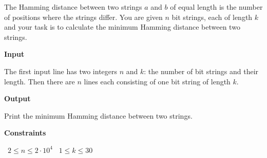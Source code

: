 The Hamming distance between two strings $a$ and $b$ of equal length is the number of positions where the strings differ.
You are given $n$ bit strings, each of length $k$ and your task is to calculate the minimum Hamming distance between two strings.

\vspace{0.3cm}\noindent\textbf{Input}

The first input line has two integers $n$ and $k$: the number of bit strings and their length.
Then there are $n$ lines each consisting of one bit string of length $k$.

\vspace{0.3cm}\noindent\textbf{Output}

Print the minimum Hamming distance between two strings.

\vspace{0.3cm}\noindent\textbf{Constraints}

\textbullet\ $2 \le n \le 2 \cdot 10^4$
\textbullet\ $1 \le k \le 30$